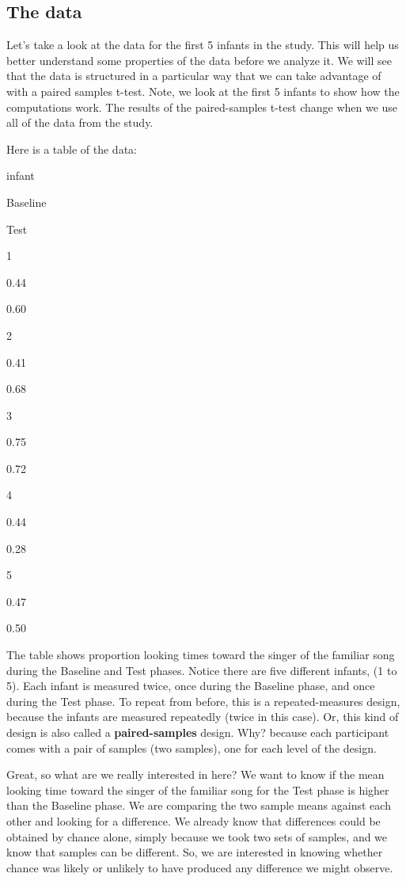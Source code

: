 \documentclass[
]{book}
\begin{document}
\hypertarget{the-data}{%
\subsection{The data}\label{the-data}}

Let's take a look at the data for the first 5 infants in the study. This will help us better understand some properties of the data before we analyze it. We will see that the data is structured in a particular way that we can take advantage of with a paired samples t-test. Note, we look at the first 5 infants to show how the computations work. The results of the paired-samples t-test change when we use all of the data from the study.

Here is a table of the data:

infant

Baseline

Test

1

0.44

0.60

2

0.41

0.68

3

0.75

0.72

4

0.44

0.28

5

0.47

0.50

The table shows proportion looking times toward the singer of the familiar song during the Baseline and Test phases. Notice there are five different infants, (1 to 5). Each infant is measured twice, once during the Baseline phase, and once during the Test phase. To repeat from before, this is a repeated-measures design, because the infants are measured repeatedly (twice in this case). Or, this kind of design is also called a \textbf{paired-samples} design. Why? because each participant comes with a pair of samples (two samples), one for each level of the design.

Great, so what are we really interested in here? We want to know if the mean looking time toward the singer of the familiar song for the Test phase is higher than the Baseline phase. We are comparing the two sample means against each other and looking for a difference. We already know that differences could be obtained by chance alone, simply because we took two sets of samples, and we know that samples can be different. So, we are interested in knowing whether chance was likely or unlikely to have produced any difference we might observe.
\end{document}

